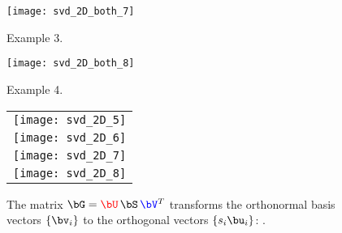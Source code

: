 \documentclass[11pt,titlepage,fleqn]{article}
\begin{document}
\clearpage\pagebreak
\begin{figure}
\hspace{-1cm}
\texttt{[image: svd\_2D\_both\_7]}
\caption[]
{{
Example 3.
\label{fig:ex3}
}}
\end{figure}

\clearpage\pagebreak
\begin{figure}
\hspace{-1cm}
\texttt{[image: svd\_2D\_both\_8]}
\caption[]
{{
Example 4.
\label{fig:ex4}
}}
\end{figure}

\clearpage\pagebreak
\pagestyle{empty}
\begin{figure}
\centering
\begin{tabular}{c}
\texttt{[image: svd\_2D\_5]} \\
\texttt{[image: svd\_2D\_6]} \\
\texttt{[image: svd\_2D\_7]} \\
\texttt{[image: svd\_2D\_8]} 
\end{tabular}
\caption[]
{{
The matrix $\bG = \textcolor{red}{\bU}\,\bS\,\textcolor{blue}{\bV}^T$ transforms the orthonormal basis vectors \textcolor{blue}{$\{\bv_i\}$} to the orthogonal vectors \textcolor{red}{$\{s_i\bu_i\}$}: \makebox{$\bG\textcolor{blue}{\bV} = \textcolor{red}{\bU}\,\bS$}.
\label{fig:2D}
}}
\end{figure}

\end{document}
